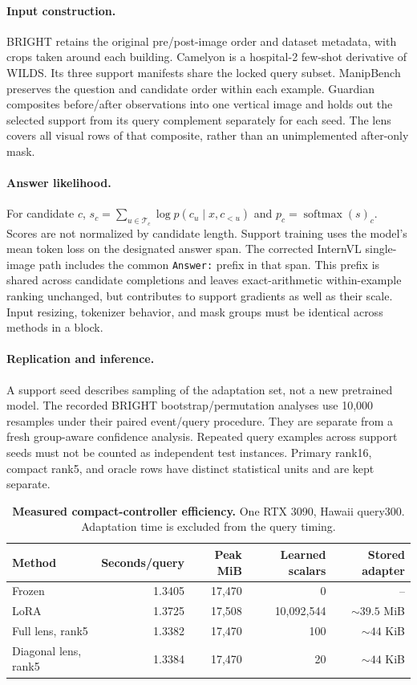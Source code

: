 \documentclass{article}
\newcommand{\sm}{\operatorname{softmax}}
\begin{document}
\paragraph{Input construction.}
BRIGHT retains the original pre/post-image order and dataset metadata, with crops taken around each building. Camelyon is a hospital-2 few-shot derivative of WILDS. Its three support manifests share the locked query subset. ManipBench preserves the question and candidate order within each example. Guardian composites before/after observations into one vertical image and holds out the selected support from its query complement separately for each seed. The lens covers all visual rows of that composite, rather than an unimplemented after-only mask.

\paragraph{Answer likelihood.}
For candidate $c$, $s_c=\sum_{u\in\mathcal T_c}\log p(c_u\mid x,c_{<u})$ and $p_c=\sm(s)_c$. Scores are not normalized by candidate length. Support training uses the model's mean token loss on the designated answer span. The corrected InternVL single-image path includes the common \texttt{Answer:} prefix in that span. This prefix is shared across candidate completions and leaves exact-arithmetic within-example ranking unchanged, but contributes to support gradients as well as their scale. Input resizing, tokenizer behavior, and mask groups must be identical across methods in a block.

\paragraph{Replication and inference.}
A support seed describes sampling of the adaptation set, not a new pretrained model. The recorded BRIGHT bootstrap/permutation analyses use 10,000 resamples under their paired event/query procedure. They are separate from a fresh group-aware confidence analysis. Repeated query examples across support seeds must not be counted as independent test instances. Primary rank16, compact rank5, and oracle rows have distinct statistical units and are kept separate.

\begin{table}[!ht]
\caption{\textbf{Measured compact-controller efficiency.} One RTX 3090, Hawaii query300. Adaptation time is excluded from the query timing.}
\label{tab:efficiency}
\centering\small
\begin{tabular}{@{}lrrrr@{}}
\toprule
Method & Seconds/query & Peak MiB & Learned scalars & Stored adapter\\
\midrule
Frozen & 1.3405 & 17,470 & 0 & --\\
LoRA & 1.3725 & 17,508 & 10,092,544 & $\sim39.5$ MiB\\
Full lens, rank5 & 1.3382 & 17,470 & 100 & $\sim44$ KiB\\
Diagonal lens, rank5 & 1.3384 & 17,470 & 20 & $\sim44$ KiB\\
\bottomrule
\end{tabular}
\end{table}
\end{document}
